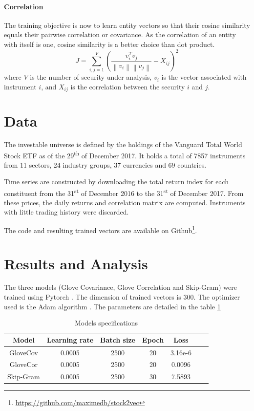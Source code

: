 \documentclass[a4paper, 11pt]{article}
\begin{document}
\paragraph{Correlation}
The training objective is now to learn entity vectors so that their cosine similarity equals their pairwise correlation or covariance.
As the correlation of an entity with itself is one, cosine similarity is a better choice than dot product.
\begin{equation}
J = \sum_{i,j=1}^{V} (\frac{v_i^T v_j }{\left \| v_i \right \|\left \| v_j \right \|} - X_{ij})^2
\end{equation}
where \(V\) is the number of security under analysis, \(v_i\) is the vector associated with instrument \(i\), and \(X_{ij}\) is the correlation between the security \(i\) and \(j\).



\section{Data}
The investable universe is defined by the holdings of the Vanguard Total World Stock ETF as of the 29\textsuperscript{th} of December 2017. It holds a total of 7857 instruments from 11 sectors, 24 industry groups, 37 currencies and 69 countries.

Time series are constructed by downloading the total return index for each constituent from the 31\textsuperscript{st} of December 2016 to the 31\textsuperscript{st} of December 2017. From these prices,  the daily returns and correlation matrix are computed. Instruments with little trading history were discarded.

The code and resulting trained vectors are available on Github\footnote{\url{https://github.com/maximedb/stock2vec}}.

\section{Results and Analysis}
The three models (Glove Covariance, Glove Correlation and Skip-Gram) were trained using Pytorch \cite{paszke2017automatic}. The dimension of trained vectors is 300. The optimizer used is the Adam algorithm \cite{DBLP:journals/corr/KingmaB14}. The parameters are detailed in the table \ref{table:models}
\begin{table}[htb]
\begin{center}
\begin{tabular}{|c|c|c|c|c|c|c|}
  \hline
  Model & Learning rate & Batch size & Epoch & Loss\\
  \hline
  GloveCov & 0.0005 & 2500 & 20 & 3.16e-6\\
  GloveCor & 0.0005 & 2500 & 20 & 0.0096\\
  Skip-Gram & 0.0005 & 2500 & 30 & 7.5893\\
  \hline
\end{tabular}
\end{center}
\caption{Models specifications}
\label{table:models}
\end{table}
\end{document}
